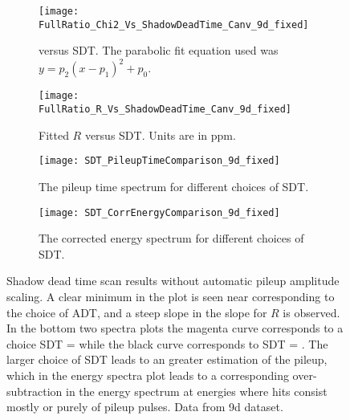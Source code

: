 \begin{figure}[]
\centering
    \begin{subfigure}[]{0.45\textwidth}
        \centering
        \texttt{[image: FullRatio\_Chi2\_Vs\_ShadowDeadTime\_Canv\_9d\_fixed]}
        \caption{\chisq versus SDT. The parabolic fit equation used was $y = p_{2}(x - p_{1})^{2} + p_{0}.$}
    \end{subfigure}%
    \hspace{1cm}
    \begin{subfigure}[]{0.45\textwidth}
        \centering
        \texttt{[image: FullRatio\_R\_Vs\_ShadowDeadTime\_Canv\_9d\_fixed]}
        \caption{Fitted $R$ versus SDT. Units are in ppm.}
    \end{subfigure}

    \begin{subfigure}[]{0.45\textwidth}
        \centering
        \texttt{[image: SDT\_PileupTimeComparison\_9d\_fixed]}
        \caption{The pileup time spectrum for different choices of SDT.}
    \end{subfigure}%
    \hspace{1cm}
    \begin{subfigure}[]{0.45\textwidth}
        \centering
        \texttt{[image: SDT\_CorrEnergyComparison\_9d\_fixed]}
        \caption{The corrected energy spectrum for different choices of SDT.}
    \end{subfigure}
\caption[Pileup shadow dead time scan without automatic pileup amplitude scaling]{Shadow dead time scan results without automatic pileup amplitude scaling. A clear minimum in the \chisq plot is seen near  corresponding to the choice of ADT, and a steep slope in the slope for $R$ is observed. In the bottom two spectra plots the magenta curve corresponds to a choice SDT =  while the black curve corresponds to SDT = . The larger choice of SDT leads to an greater estimation of the pileup, which in the energy spectra plot leads to a corresponding over-subtraction in the energy spectrum at energies where hits consist mostly or purely of pileup pulses. Data from 9d dataset.}
\label{fig:SDTscan_noScaling}
\end{figure}


